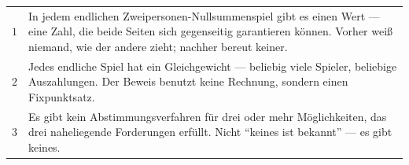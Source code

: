 \begin{merksatz}
\begin{center}
{\small
\renewcommand{\arraystretch}{1.55}
\begin{tabular}{@{}P{1.0cm}P{7.4cm}@{}}
\toprule
$1$ & In jedem endlichen Zweipersonen-Nullsummenspiel gibt es einen Wert --- eine Zahl, die beide Seiten sich gegenseitig garantieren können. Vorher weiß niemand, wie der andere zieht; nachher bereut keiner. \\
$2$ & Jedes endliche Spiel hat ein Gleichgewicht --- beliebig viele Spieler, beliebige Auszahlungen. Der Beweis benutzt keine Rechnung, sondern einen Fixpunktsatz. \\
$3$ & Es gibt kein Abstimmungsverfahren für drei oder mehr Möglichkeiten, das drei naheliegende Forderungen erfüllt. Nicht \enquote{keines ist bekannt} --- es gibt keines. \\
\bottomrule
\end{tabular}}
\end{center}

\begin{center}
\begin{minipage}{0.88\textwidth}
\end{minipage}
\end{center}
\end{merksatz}

